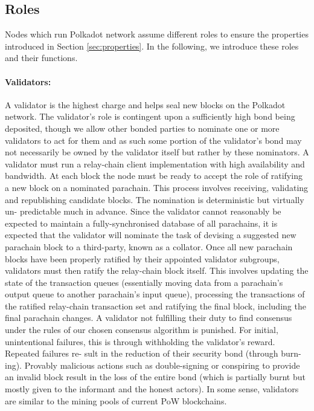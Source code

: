 \subsection{Roles}
Nodes which run Polkadot network assume different roles to ensure the properties introduced in Section \ref{sec:properties}. In the following, we introduce these roles and their functions.

  
\paragraph{Validators:} A validator is the highest charge and helps seal new blocks on the Polkadot network. The validator’s role is contingent upon a sufficiently high bond being deposited, though we allow other bonded parties to nominate one or more validators to act for them and as such some portion of the validator’s bond may not necessarily be owned by the validator itself but rather by these nominators.
A validator must run a relay-chain client implementation with high availability and bandwidth. At each block the node must be ready to accept the role of ratifying a new block on a nominated parachain. This process involves receiving, validating and republishing candidate blocks. The nomination is deterministic but virtually un- predictable much in advance. Since the validator cannot reasonably be expected to maintain a fully-synchronised database of all parachains, it is expected that the validator will nominate the task of devising a suggested new parachain block to a third-party, known as a collator.
Once all new parachain blocks have been properly ratified by their appointed validator subgroups, validators must then ratify the relay-chain block itself. This involves updating the state of the transaction queues (essentially moving data from a parachain’s output queue to another parachain’s input queue), processing the transactions of the ratified relay-chain transaction set and ratifying the final block, including the final parachain changes. A validator not fulfilling their duty to find consensus under the rules of our chosen consensus algorithm is punished. For initial, unintentional failures, this is through withholding the validator’s reward. Repeated failures re- sult in the reduction of their security bond (through burn- ing). Provably malicious actions such as double-signing or conspiring to provide an invalid block result in the loss of the entire bond (which is partially burnt but mostly given to the informant and the honest actors).
In some sense, validators are similar to the mining pools of current PoW blockchains.

